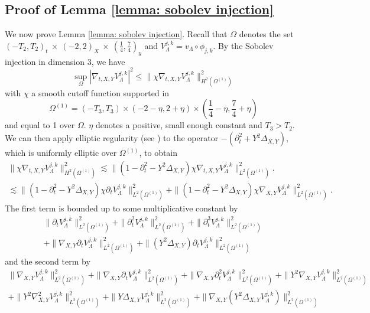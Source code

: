 \documentclass[letterpaper,11pt]{amsart}
\theoremstyle{note}
\numberwithin{equation}{section}
\begin{document}
\subsection{Proof of Lemma \ref{lemma: sobolev injection}}
\label{sec: proof Sobolev injection}

We now prove Lemma \ref{lemma: sobolev injection}. Recall that $\Omega$ denotes the set $(-T_2, T_2)_t~\times~(-2, 2)_X~\times~\left(\frac{1}{4}, \frac{7}{4}\right)_y$ and $V_\Lambda^{j,k} = v_\Lambda \circ \phi_{j,k}$. By the Sobolev injection in dimension 3, we have $$\sup_\Omega | \nabla_{t,X,Y} V_\Lambda^{j,k}|^2 \leq \|\chi \nabla_{t,X,Y} V_\Lambda^{j,k} \|_{H^2(\Omega^{(1)})}^2$$ with $\chi$ a smooth cutoff function supported in $$\Omega^{(1)} = (-T_3,T_3) \times (-2-\eta,2+\eta) \times \left(\frac{1}{4}-\eta,\frac{7}{4}+\eta\right)$$ and equal to 1 over $\Omega$. $\eta$ denotes a positive, small enough constant and $T_3 > T_2$. We can then apply elliptic regularity (see \cite[Section 6.3]{evans2022book}) to the operator $-(\partial_t^2 + Y^2 \Delta_{X,Y})$, which is uniformly elliptic over $\Omega^{(1)}$, to obtain \begin{multline}
\label{eq: elliptic regularity}
\|\chi\nabla_{t,X,Y} V_\Lambda^{j,k} \|_{H^2(\Omega^{(1)})}^2 \lesssim \|(1 - \partial_t^2 - Y^2 \Delta_{X,Y}) \chi\nabla_{t,X,Y}V_\Lambda^{j,k} \|_{L^2(\Omega^{(1)})}^2. \\
\lesssim \|(1 - \partial_t^2 - Y^2 \Delta_{X,Y}) \chi \partial_t V_\Lambda^{j,k} \|_{L^2(\Omega^{(1)})}^2 + \|(1 - \partial_t^2 - Y^2 \Delta_{X,Y}) \chi \nabla_{X,Y}V_\Lambda^{j,k} \|_{L^2(\Omega^{(1)})}^2.
\end{multline} The first term is bounded up to some multiplicative constant by \begin{multline}
\label{eq: time derivative term bound 1}
\|\partial_t V_{\Lambda}^{j,k}\|_{L^2(\Omega^{(1)})}^2 + \|\partial_t^2 V_{\Lambda}^{j,k}\|_{L^2(\Omega^{(1)})}^2 + \|\partial_t^3 V_{\Lambda}^{j,k}\|_{L^2(\Omega^{(1)})}^2 \\+ \|\nabla_{X,Y} \partial_t V_\Lambda^{j,k}\|_{L^2(\Omega^{(1)})}^2 + \|(Y^2 \Delta_{X,Y}) \partial_tV_\Lambda^{j,k}\|_{L^2(\Omega^{(1)})}^2\end{multline} and the second term by \begin{multline}
    \label{eq: gradient term bound 1}
    \|\nabla_{X,Y}V_\Lambda^{j,k} \|_{L^2(\Omega^{(1)})}^2 + \|\nabla_{X,Y} \partial_t V_\Lambda^{j,k} \|_{L^2(\Omega^{(1)})}^2 + \|\nabla_{X,Y} \partial_t^2 V_\Lambda^{j,k} \|_{L^2(\Omega^{(1)})}^2 + \|Y^2 \nabla_{X,Y}V_\Lambda^{j,k} \|_{L^2(\Omega^{(1)})}^2 \\+ \|Y^2\nabla_{X,Y}^2 V_\Lambda^{j,k} \|_{L^2(\Omega^{(1)})}^2 + \|Y \Delta_{X,Y}V_\Lambda^{j,k} \|_{L^2(\Omega^{(1)})}^2 + \|\nabla_{X,Y} (Y^2 \Delta_{X,Y} V_\Lambda^{j,k}) \|_{L^2(\Omega^{(1)})}^2

\end{multline}
\end{document}

